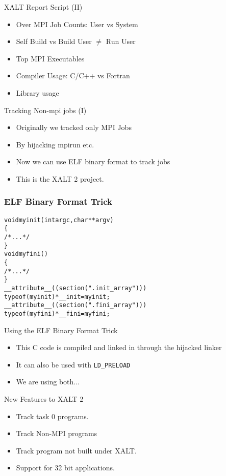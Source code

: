 \documentclass{beamer}
\begin{document}
\begin{frame}{XALT Report Script (II)}
  \begin{itemize}
    \item Over MPI Job Counts: User vs System
    \item Self Build vs Build User $\neq$ Run User
    \item Top MPI Executables
    \item Compiler Usage: C/C++ vs Fortran
    \item Library usage
  \end{itemize}
\end{frame}

\begin{frame}{Tracking Non-mpi jobs (I)}
  \begin{itemize}
    \item Originally we tracked only MPI Jobs
    \item By hijacking mpirun etc.
    \item Now we can use ELF binary format to track jobs
    \item This is the XALT 2 project.
  \end{itemize}
\end{frame}

\begin{frame}[fragile]
    \frametitle{ELF Binary Format Trick}
 {\small
    \begin{alltt}
void myinit(int argc, char **argv)
\{
  /* ... */
\}
void myfini()
\{
  /* ... */
\}
  __attribute__((section(".init_array")))
       typeof(myinit) *__init = myinit;
  __attribute__((section(".fini_array")))
       typeof(myfini) *__fini = myfini;
    \end{alltt}
}
\end{frame}

\begin{frame}{Using the ELF Binary Format Trick}
  \begin{itemize}
    \item This C code is compiled and linked in through the hijacked linker
    \item It can also be used with \texttt{LD\_PRELOAD}
    \item We are using both...
  \end{itemize}
\end{frame}

\begin{frame}{New Features to XALT 2}
  \begin{itemize}
    \item Track task 0 programs.
    \item Track Non-MPI programs
    \item Track program not built under XALT.
    \item Support for 32 bit applications.
  \end{itemize}
\end{frame}
\end{document}
